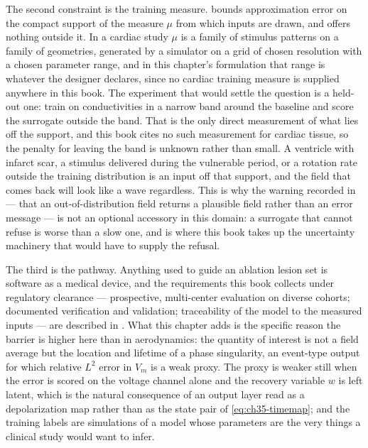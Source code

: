 The second constraint is the training measure. 
bounds approximation error on the compact support of the measure $\mu$ from
which inputs are drawn, and offers nothing outside it. In a cardiac study $\mu$
is a family of stimulus patterns on a family of geometries, generated by a
simulator on a grid of chosen resolution with a chosen parameter range, and in
this chapter's formulation that range is whatever the designer declares, since no
cardiac training measure is supplied anywhere in this book. The
experiment that would settle the question is a held-out one: train on
conductivities in a narrow band around the baseline and score the surrogate
outside the band. That is the only direct measurement of what lies off the
support, and this book cites no such measurement for cardiac tissue, so the
penalty for leaving the band is unknown rather than small. A
ventricle with infarct scar, a stimulus delivered during the vulnerable period,
or a rotation rate outside the training distribution is an input off that
support, and the field that comes back will look like a wave regardless. This
is why the warning recorded in
 --- that an
out-of-distribution field returns a plausible field rather than an error
message --- is not an optional accessory in this domain: a surrogate that cannot
refuse is worse than a slow one, and
 is where this book
takes up the uncertainty machinery that would have to supply the refusal.

The third is the pathway. Anything used to guide an ablation lesion set is
software as a medical device, and the requirements this book
collects under regulatory clearance --- prospective, multi-center evaluation on
diverse cohorts; documented verification and validation; traceability of the
model to the measured inputs --- are described in
. What this chapter
adds is the specific reason the barrier is higher here than in aerodynamics: the
quantity of interest is not a field average but the location and lifetime of a
phase singularity, an event-type output for which relative $L^2$ error in $V_m$
is a weak proxy. The proxy is weaker still when the error is scored on the voltage
channel alone and the recovery variable $w$ is left latent, which is the natural
consequence of an output layer read as a depolarization map rather than as the
state pair of \eqref{eq:ch35-timemap}; and the training
labels are simulations of a model whose
parameters are the very things a clinical study would want to infer.

